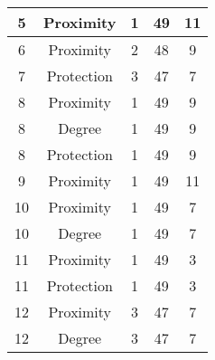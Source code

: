 \documentclass[results.tex]{subfiles}
\begin{document}
\begin{center}
\begin{tabular}{| c || c | c | c | c |}
            \hline
            5                       & Proximity                    & 1                      & 49                      & 11                   \\
            \hline
            6                       & Proximity                    & 2                      & 48                      & 9                    \\
            \hline
            7                       & Protection                   & 3                      & 47                      & 7                    \\
            \hline
            8                       & Proximity                    & 1                      & 49                      & 9                    \\
            \hline
            8                       & Degree                       & 1                      & 49                      & 9                    \\
            \hline
            8                       & Protection                   & 1                      & 49                      & 9                    \\
            \hline
            9                       & Proximity                    & 1                      & 49                      & 11                   \\
            \hline
            10                      & Proximity                    & 1                      & 49                      & 7                    \\
            \hline
            10                      & Degree                       & 1                      & 49                      & 7                    \\
            \hline
            11                      & Proximity                    & 1                      & 49                      & 3                    \\
            \hline
            11                      & Protection                   & 1                      & 49                      & 3                    \\
            \hline
            12                      & Proximity                    & 3                      & 47                      & 7                    \\
            \hline
            12                      & Degree                       & 3                      & 47                      & 7                    \\

\end{tabular}
\end{center}
\end{document}
